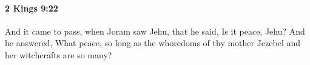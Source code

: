 
		\paragraph{2 Kings 9:22} %
			\label{2KINGS-9-22}

			And it came to pass, when Joram saw Jehu, that he said, Is it peace, Jehu? And he answered, What peace, so long as the whoredoms of thy mother Jezebel and her witchcrafts are so many?



